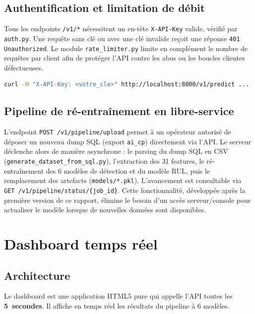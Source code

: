 \documentclass[12pt,a4paper]{report}
\begin{document}
\subsection{Authentification et limitation de débit}
\label{subsec:auth}

Tous les endpoints \texttt{/v1/*} nécessitent un en-tête \texttt{X-API-Key} valide,
vérifié par \texttt{auth.py}. Une requête sans clé ou avec une clé invalide reçoit une
réponse \texttt{401 Unauthorized}. Le module \texttt{rate\_limiter.py} limite en complément
le nombre de requêtes par client afin de protéger l'API contre les abus ou les boucles
clientes défectueuses.

\begin{lstlisting}[language=bash]
curl -H "X-API-Key: <votre_cle>" http://localhost:8000/v1/predict ...
\end{lstlisting}

\subsection{Pipeline de ré-entraînement en libre-service}
\label{subsec:retrain}

L'endpoint \texttt{POST /v1/pipeline/upload} permet à un opérateur autorisé de déposer un
nouveau dump SQL (export \texttt{ai\_cp}) directement via l'API. Le serveur déclenche alors
de manière asynchrone : le parsing du dump SQL en CSV (\texttt{generate\_dataset\_from\_sql.py}),
l'extraction des 31 features, le ré-entraînement des 6 modèles de détection et du modèle
RUL, puis le remplacement des artefacts (\texttt{models/*.pkl}). L'avancement est consultable
via \texttt{GET /v1/pipeline/status/\{job\_id\}}. Cette fonctionnalité, développée après la
première version de ce rapport, élimine le besoin d'un accès serveur/console pour
actualiser le modèle lorsque de nouvelles données sont disponibles.

\section{Dashboard temps réel}

\subsection{Architecture}

Le dashboard est une application HTML5 pure qui appelle l'API toutes les \textbf{5~secondes}.
Il affiche en temps réel les résultats du pipeline à 6 modèles.
\end{document}
